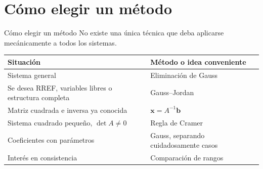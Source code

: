 \documentclass[aspectratio=169,9pt]{beamer}
\theoremstyle{remark}
\begin{document}
\section{Cómo elegir un método}
\begin{frame}[allowframebreaks,t]{Cómo elegir un método}
No existe una única técnica que deba aplicarse mecánicamente a todos los sistemas.

\begin{center}
\begin{tabular}{p{}p{}}
\toprule
\textbf{Situación} & \textbf{Método o idea conveniente}\\
\midrule
Sistema general & Eliminación de Gauss\\
Se desea RREF, variables libres o estructura completa & Gauss--Jordan\\
Matriz cuadrada e inversa ya conocida & $\mathbf x=A^{-1}\mathbf b$\\
Sistema cuadrado pequeño, $\det A\neq0$ & Regla de Cramer\\
Coeficientes con parámetros & Gauss, separando cuidadosamente casos\\
Interés en consistencia & Comparación de rangos\\
\bottomrule
\end{tabular}
\end{center}
\end{frame}
\end{document}
